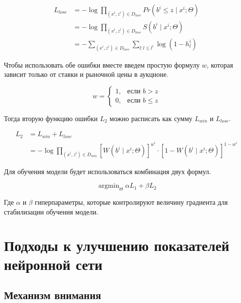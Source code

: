 \documentclass[times,specification,annotation]{itmo-student-thesis}
\DeclareMathOperator*{\argmin}{argmin}
\begin{document}
\begin{equation}
    \begin{split}
        L_{lose} & = - \log \prod_{(x^i, z^i) \in D_{lose}} Pr(b^i \leq z \mid x^i; \Theta) \\
        & = - \log \prod_{(x^i, z^i) \in D_{lose}} S(b^i \mid x^i; \Theta) \\
        & = - \sum_{(x^i, z^i) \in D_{lose}} \sum_{l: l \leq l^i} \log (1 - h_l^i)
    \end{split}
\end{equation}

Чтобы использовать обе ошибки вместе введем простую формулу $w$, которая зависит только от ставки и рыночной цены в аукционе.

\begin{equation}
    w = \begin{cases}
        1, & \mbox{если } b > z \\ 0, & \mbox{если } b \leq z
    \end{cases}
\end{equation}

Тогда вторую функцию ошибки $L_2$ можно расписать как сумму $L_{win}$ и $L_{lose}$.

\begin{equation}
    \begin{split}
        L_2 & = L_{win} + L_{lose} \\
        & = - \log \prod_{(x^i, z^i) \in D_{win}} {[W(b^i \mid x^i; \Theta)]}^{w^i} \cdot {\left[1 - W(b^i \mid x^i; \Theta)\right]}^{1 - w^i}
    \end{split}
\end{equation}

Для обучения модели будет использоваться комбинация двух формул.

\begin{equation}
    \argmin_{\Theta} \alpha L_1 + \beta L_2
\end{equation}

Где $\alpha$ и $\beta$ гиперпараметры, которые контролируют величину градиента для стабилизации обучения модели.

\section{Подходы к улучшению показателей нейронной сети}

\subsection{Механизм внимания}
\end{document}
